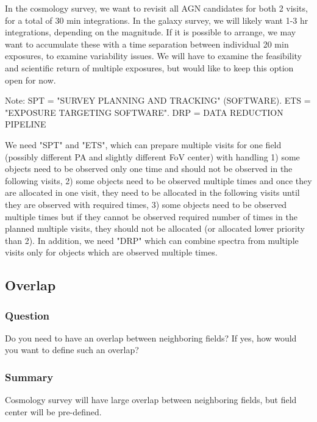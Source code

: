 \documentclass[a4paper,notitlepage]{article}
\begin{document}
In the cosmology survey, we want to revisit all AGN candidates for 
both 2 visits, for a total of 30 min integrations. In the galaxy 
survey, we will likely want 1-3 hr integrations, depending on the 
magnitude. If it is possible to arrange, we may want to accumulate 
these with a time separation between individual 20 min exposures, 
to examine variability issues.  We will have to examine the feasibility 
and scientific return of multiple exposures, but would like to keep 
this option open for now.

Note: 
SPT = "SURVEY PLANNING AND TRACKING" (SOFTWARE). ETS = "EXPOSURE TARGETING SOFTWARE".  DRP = DATA REDUCTION PIPELINE

We need "SPT" and "ETS", which can prepare multiple visits for one 
field (possibly different PA and slightly different FoV center) 
with handling
1) some objects need to be observed only one time and should not
be observed in the following visits,
2) some objects need to be observed multiple times and once they
are allocated in one visit, they need to be allocated in the 
following visits until they are observed with required times,
3) some objects need to be observed multiple times but if they
cannot be observed required number of times in the planned
multiple visits, they should not be allocated (or allocated lower
priority than 2).
In addition, we need "DRP" which can combine spectra from multiple
visits only for objects which are observed multiple times.


\subsection{Overlap}
\subsubsection{Question}
Do you need to have an overlap between neighboring fields? If yes, how would you want to define such an overlap? 

\subsubsection{Summary}

Cosmology survey will have large overlap between neighboring fields, but field 
center will be pre-defined. 
\end{document}
